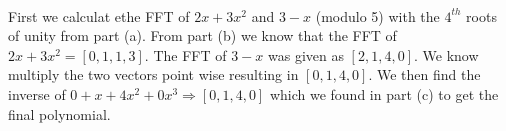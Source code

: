 \documentclass[11pt]{article}
\begin{document}
\begin{subparts}
\begin{solution}\\
    First we calculat ethe FFT of $2x + 3x^2$ and $3 - x$ (modulo 5) with the $4^{th}$ roots of unity from part (a). From part (b) we know that 
    the FFT of $2x + 3x^2 = [0, 1, 1, 3]$. The FFT of $3 - x$ was given as $[2, 1, 4, 0]$. We know multiply the two vectors point wise resulting in 
    $[0, 1, 4, 0]$. We then find the inverse of $0 + x + 4x^2 + 0x^3 \Rightarrow [0, 1, 4, 0]$ which we found in part (c) to get the final polynomial.
\end{solution}
\end{subparts}
\end{document}
